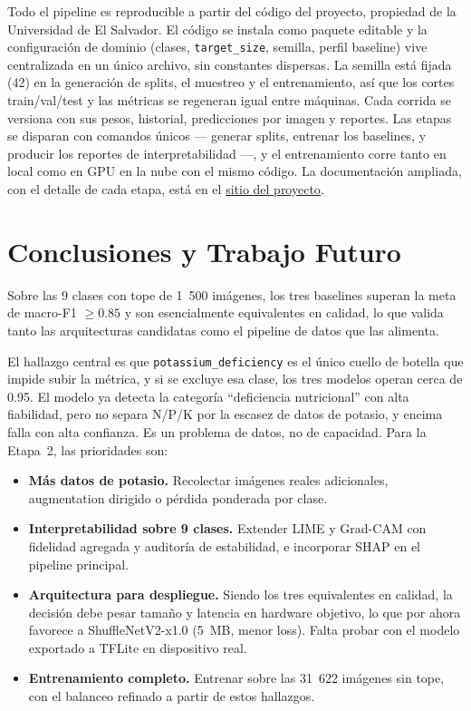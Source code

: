 \documentclass[12pt,letterpaper]{article}
\begin{document}
Todo el pipeline es reproducible a partir del c\'odigo del proyecto, propiedad de la Universidad de El Salvador. El c\'odigo se instala como paquete editable y la configuraci\'on de dominio (clases, \texttt{target\_size}, semilla, perfil baseline) vive centralizada en un \'unico archivo, sin constantes dispersas. La semilla est\'a fijada (42) en la generaci\'on de splits, el muestreo y el entrenamiento, as\'i que los cortes train/val/test y las m\'etricas se regeneran igual entre m\'aquinas. Cada corrida se versiona con sus pesos, historial, predicciones por imagen y reportes. Las etapas se disparan con comandos \'unicos --- generar splits, entrenar los baselines, y producir los reportes de interpretabilidad ---, y el entrenamiento corre tanto en local como en GPU en la nube con el mismo c\'odigo. La documentaci\'on ampliada, con el detalle de cada etapa, est\'a en el \href{https://doctor-maiz.deras.dev/es}{sitio del proyecto}.

\section{Conclusiones y Trabajo Futuro}

Sobre las 9 clases con tope de 1~500 im\'agenes, los tres baselines superan la meta de macro-F1 $\geq0.85$ y son esencialmente equivalentes en calidad, lo que valida tanto las arquitecturas candidatas como el pipeline de datos que las alimenta.

El hallazgo central es que \texttt{potassium\_deficiency} es el \'unico cuello de botella que impide subir la m\'etrica, y si se excluye esa clase, los tres modelos operan cerca de 0.95. El modelo ya detecta la categor\'ia ``deficiencia nutricional'' con alta fiabilidad, pero no separa N/P/K por la escasez de datos de potasio, y encima falla con alta confianza. Es un problema de datos, no de capacidad. Para la Etapa~2, las prioridades son:

\begin{itemize}
\item \textbf{M\'as datos de potasio.} Recolectar im\'agenes reales adicionales, augmentation dirigido o p\'erdida ponderada por clase.
\item \textbf{Interpretabilidad sobre 9 clases.} Extender LIME y Grad-CAM con fidelidad agregada y auditor\'ia de estabilidad, e incorporar SHAP en el pipeline principal.
\item \textbf{Arquitectura para despliegue.} Siendo los tres equivalentes en calidad, la decisi\'on debe pesar tama\~no y latencia en hardware objetivo, lo que por ahora favorece a ShuffleNetV2-x1.0 (5~MB, menor loss). Falta probar con el modelo exportado a TFLite en dispositivo real.
\item \textbf{Entrenamiento completo.} Entrenar sobre las 31~622 im\'agenes sin tope, con el balanceo refinado a partir de estos hallazgos.
\end{itemize}
\end{document}
